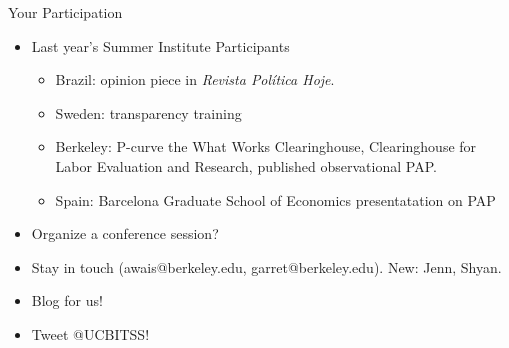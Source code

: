 \documentclass{beamer}
\begin{document}
\begin{frame}{Your Participation}
\begin{itemize}
\item Last year's Summer Institute Participants
\begin{itemize}
\item Brazil: opinion piece in \textit{Revista Política Hoje}.  \href{http://bitss.org/2014/11/19/replication-brazil/}{}
\item Sweden: transparency training \href{http://bitss.org/2014/10/28/swedish-graduate-student-training/}{}
\item Berkeley: P-curve the What Works Clearinghouse, Clearinghouse for Labor Evaluation and Research, published observational PAP. \href{http://obsstudies.org/journal.php?id=17}{}
\item Spain: Barcelona Graduate School of Economics presentatation on PAP
\end{itemize}
\item Organize a conference session?
\item Stay in touch (awais@berkeley.edu, garret@berkeley.edu). New: Jenn, Shyan.
\item Blog for us! 
\item Tweet @UCBITSS!
\end{itemize}
\end{frame}
\end{document}
